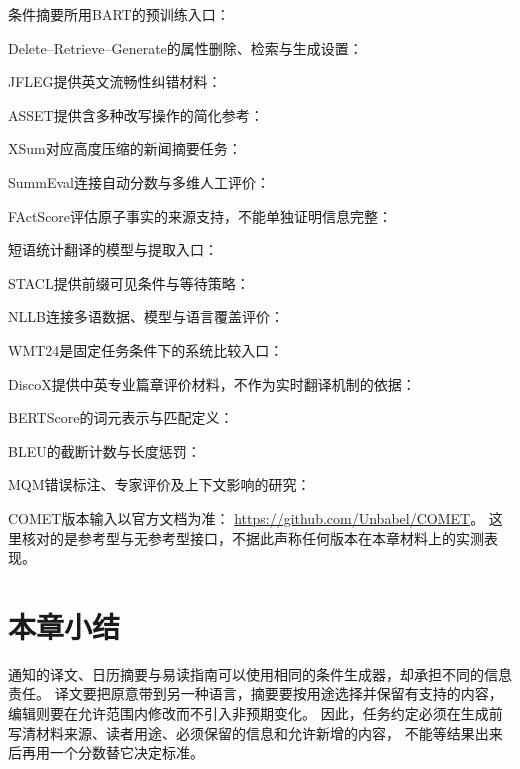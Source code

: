 \begin{fullwidth}
\small
条件摘要所用BART的预训练入口：
\par\smallskip
Delete--Retrieve--Generate的属性删除、检索与生成设置：
\par\smallskip
JFLEG提供英文流畅性纠错材料：
\par\smallskip
ASSET提供含多种改写操作的简化参考：
\par\smallskip
XSum对应高度压缩的新闻摘要任务：
\par\smallskip
SummEval连接自动分数与多维人工评价：
\par\smallskip
FActScore评估原子事实的来源支持，不能单独证明信息完整：
\par\smallskip
短语统计翻译的模型与提取入口：
\par\smallskip
STACL提供前缀可见条件与等待策略：
\par\smallskip
NLLB连接多语数据、模型与语言覆盖评价：
\par\smallskip
WMT24是固定任务条件下的系统比较入口：
\par\smallskip
DiscoX提供中英专业篇章评价材料，不作为实时翻译机制的依据：
\par\smallskip
BERTScore的词元表示与匹配定义：
\par\smallskip
BLEU的截断计数与长度惩罚：
\par\smallskip
MQM错误标注、专家评价及上下文影响的研究：
\par\smallskip
COMET版本输入以官方文档为准：
\url{https://github.com/Unbabel/COMET}。
这里核对的是参考型与无参考型接口，不据此声称任何版本在本章材料上的实测表现。
\end{fullwidth}

\section{本章小结}
\label{sec:nlp-generation-summary}

通知的译文、日历摘要与易读指南可以使用相同的条件生成器，却承担不同的信息责任。
译文要把原意带到另一种语言，摘要要按用途选择并保留有支持的内容，
编辑则要在允许范围内修改而不引入非预期变化。
因此，任务约定必须在生成前写清材料来源、读者用途、必须保留的信息和允许新增的内容，
不能等结果出来后再用一个分数替它决定标准。

